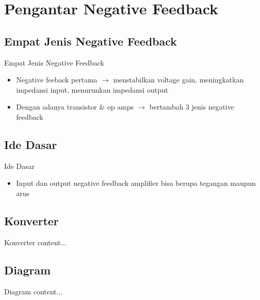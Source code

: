 \section{Pengantar Negative Feedback}

\subsection{Empat Jenis Negative Feedback}	
\begin{frame}{Empat Jenis Negative Feedback}	
	\begin{itemize}
		\item Negative feeback pertama $ \rightarrow $ menstabilkan voltage gain, meningkatkan impedansi input, menurunkan impedansi output
		\item Dengan adanya transistor \& op amps $\rightarrow$ bertambah 3 jenis negative feedback
	\end{itemize}
\end{frame}

\subsection{Ide Dasar}
\begin{frame}{Ide Dasar}
	\begin{itemize}
		\item Input dan output negative feedback amplifier bisa berupa tegangan maupun arus
	\end{itemize}
\end{frame}

\subsection{Konverter}
\begin{frame}{Konverter}
	content...
\end{frame}

\subsection{Diagram}
\begin{frame}{Diagram}
	content...
\end{frame}